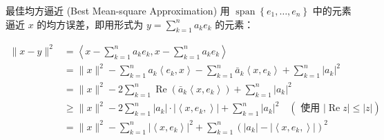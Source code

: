 \documentclass[
  ignorenonframetext,
]{beamer}
\begin{document}
\begin{frame}{最佳均方逼近 (Best Mean-square Approximation)}
\protect{}\label{ux6700ux4f73ux5747ux65b9ux903cux8fd1-best-mean-square-approximation}
用 \(\operatorname{span}\left\{e_{1}, \ldots, e_{n}\right\}\)
中的元素逼近 \(x\) 的均方误差，即用形式为
\(y=\sum_{k=1}^{n} a_{k} e_{k}\) 的元素：

\[
\begin{aligned}
\|x-y\|^{2} & =\left\langle x-\sum_{k=1}^{n} a_{k} e_{k}, x-\sum_{k=1}^{n} a_{k} e_{k}\right\rangle \\
& =\|x\|^{2}-\sum_{k=1}^{n} a_{k}\left\langle e_{k}, x\right\rangle-\sum_{k=1}^{n} \bar{a}_{k}\left\langle x, e_{k}\right\rangle+\sum_{k=1}^{n}\left|a_{k}\right|^{2} \\
& =\|x\|^{2}-2 \sum_{k=1}^{n} \operatorname{Re}\left(\bar{a}_{k}\left\langle x, e_{k}\right\rangle\right)+\sum_{k=1}^{n}\left|a_{k}\right|^{2} \\
& \geq\|x\|^{2}-2 \sum_{k=1}^{n}\left|a_{k}\right| \cdot\left|\left\langle x, e_{k},\right\rangle\right|+\sum_{k=1}^{n}\left|a_{k}\right|^{2} \quad(\text { 使用 }|\operatorname{Re} z| \leq|z|) \\
& =\|x\|^{2}-\sum_{k=1}^{n}\left|\left\langle x, e_{k}\right\rangle\right|^{2}+\sum_{k=1}^{n}\left(\left|a_{k}\right|-\left|\left\langle x, e_{k},\right\rangle\right|\right)^{2}
\end{aligned}
\]
\end{frame}
\end{document}
